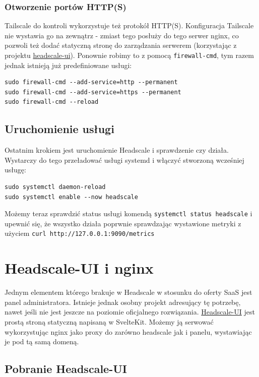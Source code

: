 \documentclass{report}
\numberwithin{equation}{section}
\begin{document}
\subsubsection{Otworzenie portów HTTP(S)}
Tailscale do kontroli wykorzystuje też protokół HTTP(S). Konfiguracja Tailscale nie wystawia go na zewnątrz - zmiast tego posłuży do tego serwer nginx, co pozwoli też dodać statyczną stronę do zarządzania serwerem (korzystając z projektu \href{https://github.com/gurucomputing/headscale-ui}{headscale-ui}). Ponownie robimy to z pomocą \texttt{firewall-cmd}, tym razem jednak istnieją już predefiniowane usługi:
\begin{verbatim}
sudo firewall-cmd --add-service=http --permanent
sudo firewall-cmd --add-service=https --permanent
sudo firewall-cmd --reload
\end{verbatim}
\subsection{Uruchomienie usługi}
Ostatnim krokiem jest uruchomienie Headscale i sprawdzenie czy działa. Wystarczy do tego przeładować usługi systemd i włączyć stworzoną wcześniej usługę:
\begin{verbatim}
sudo systemctl daemon-reload
sudo systemctl enable --now headscale
\end{verbatim}
Możemy teraz sprawdzić status usługi komendą \texttt{systemctl status headscale} i upewnić się, że wszystko działa poprwnie sprawdzając wystawione metryki z użyciem \texttt{curl http://127.0.0.1:9090/metrics}

\section{Headscale-UI i nginx}

Jednym elementem którego brakuje w Headscale w stosunku do oferty SaaS jest panel administratora. Istnieje jednak osobny projekt adresujący tę potrzebę, nawet jeśli nie jest jeszcze na poziomie oficjalnego rozwiązania. \href{https://github.com/gurucomputing/headscale-ui}{Headscale-UI} jest prostą stroną statyczną napisaną w SvelteKit. Możemy ją serwować wykorzystując nginx jako proxy do zarówno headscale jak i panelu, wystawiając je pod tą samą domeną.

\subsection{Pobranie Headscale-UI}
\end{document}
